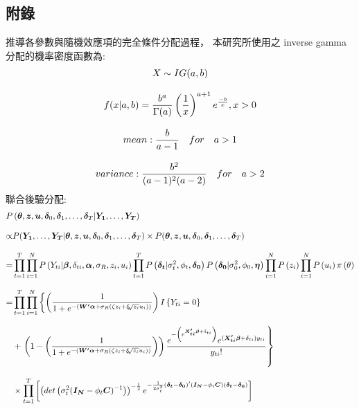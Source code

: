 \documentclass[12pt,a4paper]{article}
\begin{document}
\begin{CJK}{UTF8}{bkai}
\newpage
\section*{附錄}
\noindent
推導各參數與隨機效應項的完全條件分配過程，
本研究所使用之 inverse gamma 分配的機率密度函數為:
 \begin{gather*}
 \setlength\abovedisplayskip{25pt}
 \setlength\belowdisplayskip{25pt}
X \sim IG(a,b) \\[3mm]
f(x|a,b) = \frac{b^a}{\Gamma(a)} \left( \frac{1}{x} \right) ^{a+1} e^{\frac{-b}{x}} ,x > 0 \\[3mm]
mean : \frac{b}{a-1} \quad for \quad a > 1 \\[3mm]
variance : \frac{b^2}{(a-1)^2(a-2)} \quad for \quad a > 2
 \end{gather*}
聯合後驗分配:
 \begin{align*}
 \setlength\abovedisplayskip{25pt}
 \setlength\belowdisplayskip{25pt}
  P & \left(\bm{\theta},\bm{z},\bm{u},\bm{\delta}_0,\bm{\delta}_1,\dots,\bm{\delta}_T|\bm{Y_1},\dots,\bm{Y_T}\right)  \\[3mm]
   \propto &  P(\bm{Y_1},\dots,\bm{Y_T}|\bm{\theta},\bm{z},\bm{u},\bm{\delta}_0,\bm{\delta}_1,\dots,\bm{\delta}_T) \times P(\bm{\theta},\bm{z},\bm{u},\bm{\delta}_0,\bm{\delta}_1,\dots,\bm{\delta}_T) \\[3mm]
   = &
\prod_{t=1}^T \prod_{i=1}^NP\left(Y_{ti}|\bm{\beta},\delta_{ti},\bm{\alpha},\sigma_R,z_i,u_i\right)\prod_{t=1}^TP\left(\bm{\delta_t}|\sigma_t^2,\phi_t,\bm{\delta_0}\right) P\left(\bm{\delta_0}|\sigma_0^2,\phi_0,\bm{\eta}\right) \prod_{i=1}^NP\left(z_i\right) \prod_{i=1}^NP\left(u_i\right) \pi\left(\theta\right) \\[3mm]
   = &
\prod_{t=1}^T\prod_{i=1}^N \left\{ \left( \frac{1}{1+e^{-(\bm{W^\prime}\bm{\alpha}+\sigma_R(\zeta z_i+\xi \sqrt[]{z_i} u_i))}} \right)I\left\{ Y_{ti} = 0\right\} \right.\\[3mm]
& + \left. \left(1-\left( \frac{1}{1+e^{-(\bm{W^\prime}\bm{\alpha}+\sigma_R(\zeta z_i+\xi \sqrt[]{z_i} u_i))}} \right)\right)\frac{e^{-\left(e^{\bm{X_{ti}^\prime\bm{\beta}}+\delta_{ti}}\right)}e^{(\bm{X_{ti}^\prime\bm{\beta}}+\delta_{ti})y_{ti}}}{y_{ti}!}\right\}\\[3mm]
  & \times
\prod_{t=1}^T\left[ \left( det\left(\sigma_t^2(\bm{I_N}-\phi_t\bm{C})^{-1}\right) \right)^{-\frac{1}{2}} e^{ -\frac{1}{2\sigma_t^2}(\bm{\delta_t}-\bm{\delta_0})^\prime(\bm{I_N}-\phi_t\bm{C})(\bm{\delta_t}-\bm{\delta_0})} \right]\\[3mm]

\end{align*}
\end{CJK}
\end{document}
